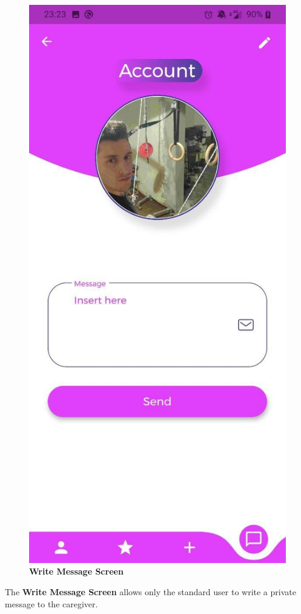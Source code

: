 \documentclass[../../dd.tex]{subfiles}
\begin{document}
    \begin{figure}[H]
        \centering
        \includegraphics[height=.6\textheight]{../../assets/screens/write_message.jpg}
        \caption{\textbf{Write Message Screen}}\label{fig:figure}
    \end{figure}
    \begin{center}
        The \textbf{Write Message Screen} allows only the standard user to write a private message to the caregiver.
    \end{center}
\end{document}
